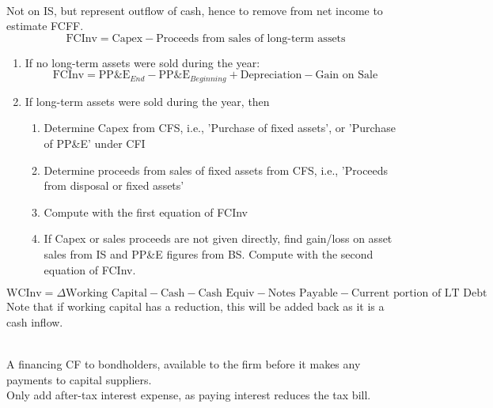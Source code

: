 \begin{method} \\
Not on IS, but represent outflow of cash, hence to remove from net income to estimate FCFF.
\begin{equation}
\text{FCInv} = \text{Capex} - \text{Proceeds from sales of long-term assets} \nonumber
\end{equation}
\begin{enumerate}[label=\roman*.]
\setlength{\itemsep}{0pt}
\item If no long-term assets were sold during the year:
\begin{equation}
\text{FCInv} = \text{PP\&E}_{End} - \text{PP\&E}_{Beginning} + \text{Depreciation} -\text{Gain on Sale} \nonumber
\end{equation}
\item If long-term assets were sold during the year, then
\begin{enumerate}[label=\arabic*.]
\setlength{\itemsep}{0pt}
\item Determine Capex from CFS, i.e., 'Purchase of fixed assets', or 'Purchase of PP\&E' under CFI
\item Determine proceeds from sales of fixed assets from CFS, i.e., 'Proceeds from disposal or fixed assets'
\item Compute with the first equation of FCInv
\item If Capex or sales proceeds are not given directly, find gain/loss on asset sales from IS and PP\&E figures from BS. Compute with the second equation of FCInv.
\end{enumerate}
\end{enumerate}
\end{method}

\begin{method} 
\begin{equation}
\text{WCInv} = \Delta\text{Working Capital} - \text{Cash} - \text{Cash Equiv} - \text{Notes Payable} - \text{Current portion of LT Debt} \nonumber
\end{equation}
Note that if working capital has a reduction, this will be added back as it is a cash inflow.
\end{method}

\begin{method} \\
A financing CF to bondholders, available to the firm before it makes any payments to capital suppliers.\\
Only add after-tax interest expense, as paying interest reduces the tax bill.
\end{method}

